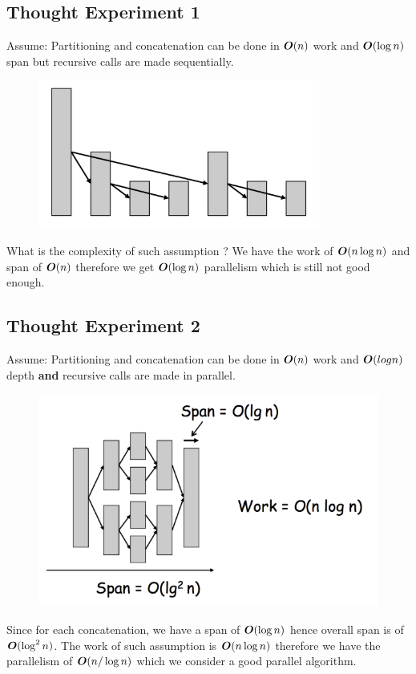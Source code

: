 \documentclass[12pt]{article}
\begin{document}
\subsection{Thought Experiment 1}

Assume: Partitioning and concatenation can be done in ${\boldsymbol O}(n)$ work and ${\boldsymbol O}(\log n)$ span but recursive calls are made sequentially.

\begin{figure}[h]
	\centering
	\includegraphics[scale=1]{qs-1.png}
\end{figure}
What is the complexity of such assumption ? We have the work of ${\boldsymbol O}(n\log n)$ and span of ${\boldsymbol O}(n)$ therefore we get ${\boldsymbol O}(\log n)$ parallelism which is still not good enough.

\subsection{Thought Experiment 2}
Assume: Partitioning and concatenation can be done in ${\boldsymbol O}(n)$ work and ${\boldsymbol O}(log n)$ depth \textbf{and} recursive calls are made in parallel.

\begin{figure}[h]
	\centering
	\includegraphics[scale=0.7]{qs-2.png}
\end{figure}
Since for each concatenation, we have a span of ${\boldsymbol O}(\log n)$ hence overall span is of ${\boldsymbol O}(\log^2 n)$. The work of such assumption is ${\boldsymbol O}(n\log n)$ therefore we have the parallelism of ${\boldsymbol O}(n/\log n)$ which we consider a good parallel algorithm.
\end{document}

